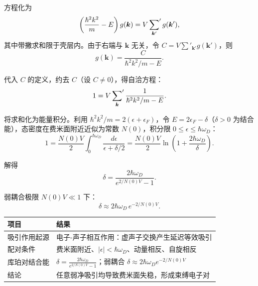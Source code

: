 \begin{derivationbox}[标准解题过程]
方程化为
\begin{equation}
\left(\frac{\hbar^2k^2}{m}-E\right)g(\bm{k})=V\sideset{}{'}\sum_{\bm{k}'}g(\bm{k}'),
\end{equation}
其中带撇求和限于壳层内。由于右端与 $\bm{k}$ 无关，令 $C=V\sum'_{\bm{k}'}g(\bm{k}')$，则
\begin{equation}
g(\bm{k})=\frac{C}{\hbar^2k^2/m-E}.
\end{equation}

代入 $C$ 的定义，约去 $C$（设 $C\neq0$），得自洽方程：
\begin{equation}
1=V\sideset{}{'}\sum_{\bm{k}}\frac{1}{\hbar^2k^2/m-E}.
\end{equation}

将求和化为能量积分。利用 $\hbar^2k^2/m=2(\epsilon+\epsilon_F)$，令 $E=2\epsilon_F-\delta$（$\delta>0$ 为结合能），态密度在费米面附近近似为常数 $N(0)$，积分限 $0\le\epsilon\le\hbar\omega_D$：
\begin{equation}
1=\frac{N(0)V}{2}\int_0^{\hbar\omega_D}\frac{d\epsilon}{\epsilon+\delta/2}
=\frac{N(0)V}{2}\ln\!\left(1+\frac{2\hbar\omega_D}{\delta}\right).
\end{equation}

解得
\begin{equation}
\delta=\frac{2\hbar\omega_D}{e^{2/N(0)V}-1}.
\end{equation}

弱耦合极限 $N(0)V\ll1$ 下：
\begin{equation}
\boxed{\delta\approx2\hbar\omega_D\,e^{-2/N(0)V}.}
\end{equation}
\end{derivationbox}

\begin{formulabox}[答案汇总]
\begin{center}
\begin{tabular}{ll}
\toprule
\textbf{项目} & \textbf{结果} \\
\midrule
吸引作用起源 & 电子-声子相互作用：虚声子交换产生延迟等效吸引 \\
配对条件 & 费米面附近、$|\epsilon|<\hbar\omega_D$、动量相反、自旋相反 \\
库珀对结合能 & $\displaystyle\delta=\frac{2\hbar\omega_D}{e^{2/N(0)V}-1}$；弱耦合 $\delta\approx2\hbar\omega_D e^{-2/N(0)V}$ \\
结论 & 任意弱净吸引均导致费米面失稳，形成束缚电子对 \\
\bottomrule
\end{tabular}
\end{center}
\end{formulabox}


